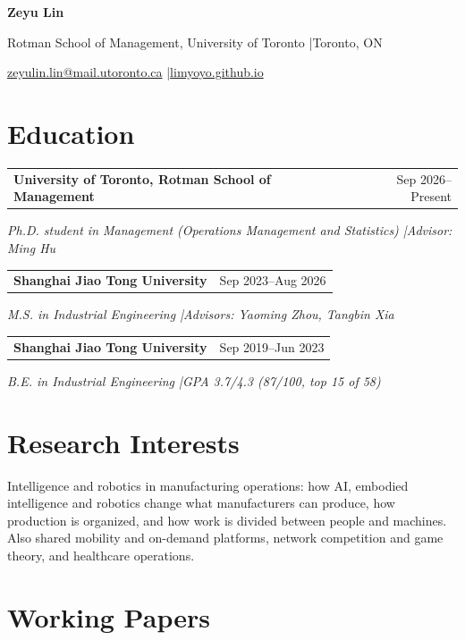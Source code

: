 \documentclass[11pt,letterpaper]{article}
\makeatletter
\newcommand{\ContactEmail}{zeyulin.lin@mail.utoronto.ca}
\newcommand{\Website}{limyoyo.github.io}
\newcommand{\entry}[3]{%
  \Needspace{4\baselineskip}%
  \begin{tabularx}{\linewidth}{@{}Xr@{}}
    \textbf{#1} & {\small #2}
  \end{tabularx}\par
  {\small\itshape #3\par}
}
\makeatother
\begin{document}
\begin{center}
  {\fontsize{25}{28}\selectfont\bfseries Zeyu Lin}\par
  \vspace{4pt}
  {\small Rotman School of Management, University of Toronto \enspace|\enspace Toronto, ON}\par
  \vspace{2pt}
  {\small \href{mailto:\ContactEmail}{\ContactEmail} \enspace|\enspace \href{https://\Website}{\Website}}\par
\end{center}
\vspace{-4pt}

\section*{Education}

\entry{University of Toronto, Rotman School of Management}{Sep 2026--Present}
  {Ph.D. student in Management (Operations Management and Statistics) \enspace|\enspace Advisor: Ming Hu}
\vspace{5pt}

\entry{Shanghai Jiao Tong University}{Sep 2023--Aug 2026}
  {M.S. in Industrial Engineering \enspace|\enspace Advisors: Yaoming Zhou, Tangbin Xia}
\vspace{5pt}

\entry{Shanghai Jiao Tong University}{Sep 2019--Jun 2023}
  {B.E. in Industrial Engineering \enspace|\enspace GPA 3.7/4.3 (87/100, top 15 of 58)}

\section*{Research Interests}

Intelligence and robotics in manufacturing operations: how AI, embodied intelligence and robotics change what manufacturers can produce, how production is organized, and how work is divided between people and machines. Also shared mobility and on-demand platforms, network competition and game theory, and healthcare operations.

\section*{Working Papers}
\end{document}
